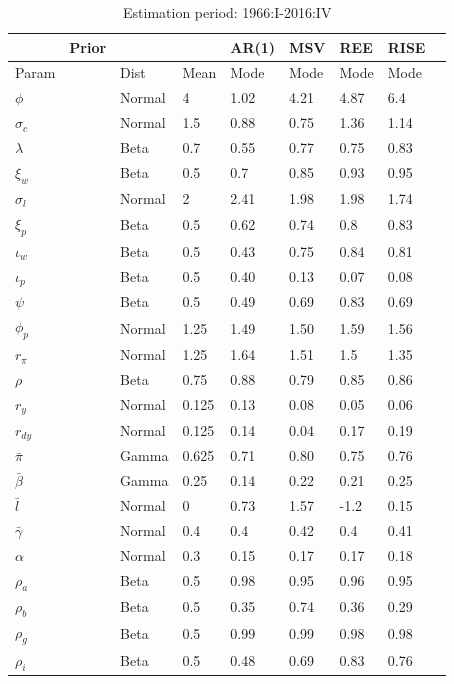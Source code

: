 \documentclass[12pt,reqno]{article}
\numberwithin{equation}{section}
\begin{document}
\begin{table}[H]
\caption{Estimation period: 1966:I-2016:IV}
\begin{tabular}{llll|ll|lll}
 & Prior &  &  & AR(1) & MSV & REE & RISE &  \\
 \hline
 \hline
Param &  & Dist & Mean & Mode & Mode & Mode & Mode &  \\
\hline
\hline
$\phi$ &  & Normal & 4        		& 1.02 & 4.21 & 4.87 & 6.4 \\
$\sigma_c$ &  & Normal & 1.5		& 0.88 & 0.75 & 1.36 & 1.14 \\
$\lambda$ &  & Beta & 0.7 			& 0.55 & 0.77 & 0.75 & 0.83 \\
$\xi_w$ &  & Beta & 0.5 			& 0.7 & 0.85 & 0.93 & 0.95 \\
$\sigma_l$ &  & Normal & 2 			& 2.41 & 1.98 & 1.98 & 1.74 \\
$\xi_p$ &  & Beta & 0.5 			& 0.62 & 0.74 & 0.8 & 0.83 \\
$\iota_w$ &  & Beta & 0.5 			& 0.43 & 0.75 & 0.84 & 0.81 \\
$\iota_p$ &  & Beta & 0.5 			& 0.40 & 0.13 & 0.07 & 0.08 \\
$\psi$ &  & Beta & 0.5 				& 0.49 & 0.69 & 0.83 & 0.69 \\
$\phi_p$ &  & Normal & 1.25 		& 1.49 & 1.50 & 1.59 & 1.56 \\
$r_{\pi}$ &  & Normal & 1.25 		& 1.64 & 1.51 & 1.5 & 1.35 \\
$\rho$ &  & Beta & 0.75 			& 0.88 & 0.79 & 0.85 & 0.86 \\
$r_y$ &  & Normal & 0.125 			& 0.13 & 0.08 & 0.05 & 0.06 \\
$r_{dy}$ &  & Normal & 0.125 		& 0.14 & 0.04 & 0.17 & 0.19 \\
$\bar{\pi}$ &  & Gamma & 0.625 		& 0.71 & 0.80 & 0.75 & 0.76 \\
$\bar{\beta}$ &  & Gamma & 0.25 	& 0.14 & 0.22 & 0.21 & 0.25 \\
$\bar{l}$ &  & Normal & 0 			& 0.73 & 1.57 & -1.2 & 0.15 \\
$\bar{\gamma}$ &  & Normal & 0.4 	& 0.4 & 0.42 & 0.4 & 0.41 \\
$\alpha$ &  & Normal & 0.3 			& 0.15 & 0.17 & 0.17 & 0.18 \\
$\rho_a$ &  & Beta & 0.5 			& 0.98 & 0.95 & 0.96 & 0.95 \\
$\rho_b$ &  & Beta & 0.5 			& 0.35 & 0.74 & 0.36 & 0.29 \\
$\rho_g$ &  & Beta & 0.5 			& 0.99 & 0.99 & 0.98 & 0.98 \\
$\rho_i$ &  & Beta & 0.5 			& 0.48 & 0.69 & 0.83 & 0.76 \\

\end{tabular}
\end{table}
\end{document}
